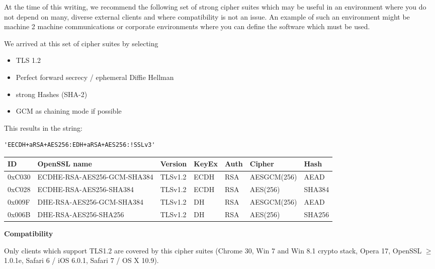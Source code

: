 At the time of this writing, we recommend the following set of strong cipher
suites which may be useful in an environment where you do not depend on many,
diverse external clients and where compatibility is not an issue.  An example
of such an environment might be machine 2 machine communications or corporate
environments where you can define the software which must be used.


We arrived at this set of cipher suites by selecting

\begin{itemize}
\item TLS 1.2
\item Perfect forward secrecy / ephemeral Diffie Hellman
\item strong Hashes (SHA-2)
\item GCM as chaining mode if possible 
\end{itemize}

This results in the string:

\begin{lstlisting}[breaklines]
'EECDH+aRSA+AES256:EDH+aRSA+AES256:!SSLv3'
\end{lstlisting}

%



\begin{center}
\begin{tabular}{| l | l | l | l | l| l | l |}
\hline
ID        & OpenSSL name                & Version & KeyEx & Auth & Cipher & Hash \\ \hline
0xC030 & ECDHE-RSA-AES256-GCM-SHA384 & TLSv1.2 & ECDH  &  RSA &AESGCM(256)  & AEAD   \\ \hline
0xC028 & ECDHE-RSA-AES256-SHA384     & TLSv1.2 & ECDH  &  RSA &AES(256)     & SHA384 \\ \hline
0x009F & DHE-RSA-AES256-GCM-SHA384   & TLSv1.2 & DH    &  RSA &AESGCM(256)  & AEAD   \\ \hline
0x006B & DHE-RSA-AES256-SHA256       & TLSv1.2 & DH    &  RSA &AES(256)     & SHA256 \\ \hline
\end{tabular}
\end{center}


\textbf{Compatibility}

Only clients which support TLS1.2 are covered by this cipher suites (Chrome 30,
Win 7 and Win 8.1 crypto stack, Opera 17, OpenSSL $\ge$ 1.0.1e, Safari 6 / iOS
6.0.1, Safari 7 / OS X 10.9).



